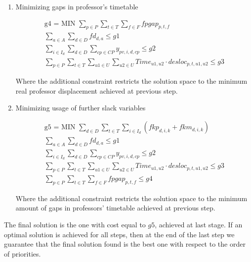 \begin{enumerate}
\item{Minimizing gaps in professor's timetable}

\begin{align*}
   \mbox{g4 = MIN  } \sum\limits_{p \in P} \sum\limits_{t \in T} \sum\limits_{f \in F} fpgap_{p,t,f}
	\\
	\sum\limits_{a \in A}\sum\limits_{d \in D} fd_{d,a} \le g1
	\\
	\sum\limits_{i \in I_{d}} \sum\limits_{d \in D} \sum\limits_{cp \in CP} y_{pv,i,d,cp} \le g2
	\\
	\sum\limits_{p \in P} \sum\limits_{t \in T} \sum\limits_{u1 \in U} \sum\limits_{u2 \in U} Time_{u1,u2} \cdot desloc_{p,t,u1,u2} \le g3
\end{align*}

Where the additional constraint restricts the solution space to the minimum real professor displacement achieved at previous step.

\item{Minimizing usage of further slack variables}

\begin{align*}
   \mbox{g5 = MIN  } \sum\limits_{d \in D} \sum\limits_{t \in T} \sum\limits_{i \in I_{d}} (fkp_{d,i,k} + fkm_{d,i,k})
	\\
	\sum\limits_{a \in A}\sum\limits_{d \in D} fd_{d,a} \le g1
	\\
	\sum\limits_{i \in I_{d}} \sum\limits_{d \in D} \sum\limits_{cp \in CP} y_{pv,i,d,cp} \le g2
	\\
	\sum\limits_{p \in P} \sum\limits_{t \in T} \sum\limits_{u1 \in U} \sum\limits_{u2 \in U} Time_{u1,u2} \cdot desloc_{p,t,u1,u2} \le g3
	\\
	\sum\limits_{p \in P} \sum\limits_{t \in T} \sum\limits_{f \in F} fpgap_{p,t,f} \le g4
\end{align*}


Where the additional constraint restricts the solution space to the minimum amount of gaps in professors' timetable achieved at previous step.

\end{enumerate}

The final solution is the one with cost equal to $g5$, achieved at last stage. If an optimal solution is achieved for all steps, then at the end of the last step we guarantee that the final solution found is the best one with respect to the order of priorities.



